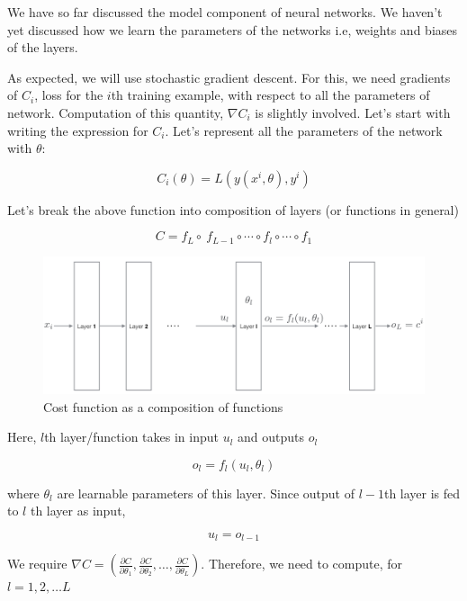 \documentclass[a4paper]{tufte-handout}
\begin{document}
We have so far discussed the model component of neural networks. We
haven't yet discussed how we learn the parameters of the networks 
i.e, weights and biases of the layers.

As expected, we will use stochastic gradient descent. For this, we need
gradients of \(C_i\), loss for the \(i\)th training example,  
with respect to all the parameters of network. Computation
of this quantity, \(\nabla C_i\) is slightly involved. Let's start with
writing the expression for \(C_i\). Let's represent all the parameters
of the network with \(\theta\):

\[ C_i(\theta) = L\left(y(x^i, \theta), y^i \right)\]

Let's break the above function into composition of layers (or functions
in general)

\[ C = f_L \circ \ f_{L-1} \circ \cdots \circ f_l \circ \cdots \circ f_1 \]

\begin{figure}
  \includegraphics[width=\linewidth]{backprop.png}
  \caption{Cost function as a composition of functions}
\end{figure}


Here, \(l\)th  layer/function takes in input
\(u_l\) and outputs \(o_l\)

\begin{equation}
o_l = f_l(u_l, \theta_l) \label{eq:1}
\end{equation}


where \(\theta_l\) are learnable parameters of this layer. Since output
of \(l-1\)th layer is fed to \(l\) th layer as input,


\begin{equation}
u_l = o_{l-1} \label{eq:2}
\end{equation}


We require
\(\nabla C = \left(\frac{\partial C}{\partial\theta_1}, \frac{\partial C}{\partial\theta_2}, \ldots, \frac{\partial C}{\partial\theta_L}\right)\).
Therefore, we need to compute, for  \( l = 1, 2, \dots L \)
\end{document}

